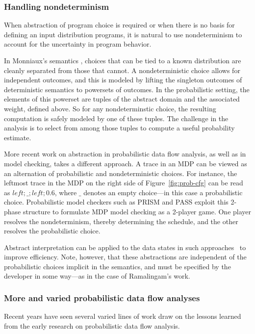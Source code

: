 \subsubsection{Handling nondeterminism}
When abstraction of program choice is required or when 
there is no basis for defining an input distribution programs,
it is natural to use nondeterminism to account for the uncertainty
in program behavior.

In Monniaux's semantics \cite{monniaux2005abstract}, choices that can be tied to a known
distribution are cleanly separated from those that cannot.
A nondeterministic choice allows for independent outcomes, and
this is modeled by lifting the singleton outcomes of deterministic
semantics to powersets of outcomes.
In the probabilistic setting, the elements of this powerset are
tuples of the abstract domain and the associated weight, defined
above.  So for any nondeterminstic choice, the resulting computation 
is safely modeled by one of these tuples.  The challenge in the
analysis is to select from among those tuples to compute a useful
probability estimate.

More recent work on abstraction in probabilistic data flow
analysis, as well as in model checking, takes a different approach.
A trace in an MDP can be viewed as an alternation of
probabilistic and nondeterministic choices.  For instance, the
leftmost trace in the MDP on the right side of Figure~\ref{fig:prob-cfg}
can be read as $\mathit{left};\_;\mathit{left};0.6$, where $\_$ 
denotes an empty choice---in this case a probabilistic choice.
Probabilistic model checkers such as PRISM and PASS exploit this
2-phase structure to formulate MDP model checking as a 2-player
game.  One player resolves the nondeterminism, thereby determining
the schedule, and the other resolves the probabilistic choice.

Abstract interpretation can be applied to the data states in
such approaches~\cite{kwiatkowska2011prism,wachter2010best,esparza2011probabilistic}
to improve efficiency.  Note, however, that these abstractions are
independent of the probabilistic choices implicit in the semantics, and must be specified
by the developer in some way---as in the case of Ramalingam's work.

\subsubsection{More and varied probabilistic data flow analyses}
Recent years have seen several varied lines of work draw on
the lessons learned from the early research on probabilistic
data flow analysis.

